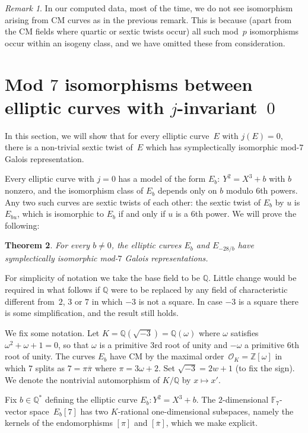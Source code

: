 \documentclass[12pt]{amsart}
\newcommand{\F}{\mathbb{F}}
\newcommand{\Q}{\mathbb{Q}}
\newcommand{\Z}{\mathbb{Z}}
\newcommand{\OO}{\mathscr{O}}
\def\w{\omega}
\def\r3{\sqrt{-3}}
\def\pibar{\overline{\pi}}
\numberwithin{equation}{section}
\newtheorem{theorem}{Theorem}[section]
\theoremstyle{definition}
\theoremstyle{remark}
\newtheorem{remark}[theorem]{Remark}
\begin{document}
\begin{remark}
In our computed data, most of the time, we do not see isomorphism arising from CM curves as in the previous remark. This is because 
(apart from the CM fields where quartic or sextic twists occur) all such mod~$p$ isomorphisms occur within an isogeny
class, and we have omitted these from consideration. 
\end{remark}


\section{Mod $7$ isomorphisms between elliptic curves with 
$j$-invariant~$0$}
In this section, we will show that for every elliptic curve~$E$ with $j(E)=0$, there is a
non-trivial sextic twist of~$E$ which has symplectically isomorphic
mod-$7$ Galois representation.

Every elliptic curve with $j=0$ has a model of the form
$E_b:\ Y^2=X^3+b$ with $b$ nonzero, and the isomorphism class of $E_b$
depends only on $b$ modulo $6$th powers.  Any two such curves are
sextic twists of each other: the sextic twist of $E_b$ by $u$ is
$E_{bu}$, which is isomorphic to $E_b$ if and only if $u$ is a $6$th
power.  We will prove the following:

\begin{theorem}\label{T:j=0}
For every $b\not=0$, the elliptic curves $E_b$ and $E_{-28/b}$ have
symplectically isomorphic mod-$7$ Galois representations.
\end{theorem}

For simplicity of notation we take the base field to be $\Q$.  Little
change would be required in what follows if $\Q$ were to be replaced
by any field of characteristic different from~$2$, $3$ or $7$ in which
$-3$ is not a square.  In case $-3$ is a square there is some
simplification, and the result still holds.

We fix some notation. 
Let $K=\Q(\r3)=\Q(\w)$ where $\w$ satisfies
$\w^2+\w+1=0$, so that $\w$ is a primitive $3$rd root of
unity and $-\w$ a primitive $6$th root of unity.  The
curves $E_b$ have CM by the maximal order~$\OO_K=\Z[\w]$ in which
$7$ splits as $7=\pi\pibar$ where $\pi=3\w+2$.  Set
$\r3=2w+1$ (to fix the sign).  We denote the nontrivial
automorphism of $K/\Q$ by $x\mapsto x'$.

Fix $b\in\Q^*$ defining the elliptic curve $E_b: Y^2=X^3+b$.  The
$2$-dimensional $\F_7$-vector space~$E_b[7]$ has two $K$-rational
one-dimensional subspaces, namely the kernels of the endomorphisms
$[\pi]$ and $[\pibar]$, which we make explicit.
\end{document}
